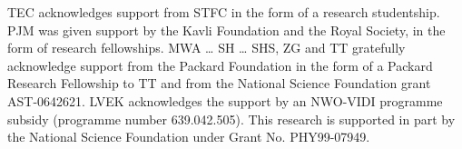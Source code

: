 TEC acknowledges support from STFC in the form of a research studentship.
%
PJM was given support by the Kavli Foundation and the Royal 
Society, in the form of research fellowships.
%
MWA \ldots
%
SH \ldots
%
SHS, ZG  and TT gratefully acknowledge support from the Packard Foundation in the form of a Packard Research Fellowship to TT and from the National Science Foundation grant AST-0642621.
% 
LVEK acknowledges the support by an NWO-VIDI programme subsidy
(programme number 639.042.505).
%
This research is supported in part by the National Science Foundation under
Grant No. PHY99-07949.

